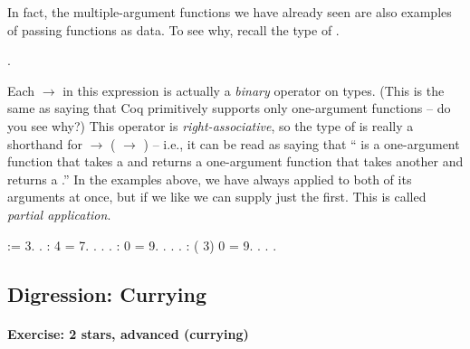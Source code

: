 \documentclass[12pt]{report}
\begin{document}
 In fact, the multiple-argument functions we have already
    seen are also examples of passing functions as data.  To see why,
    recall the type of . \begin{coqdoccode}
\coqdocemptyline
\coqdocnoindent
{} .\coqdoceol
\coqdocemptyline
\end{coqdoccode}
Each \ensuremath{\rightarrow} in this expression is actually a \textit{binary} operator
    on types.  (This is the same as saying that Coq primitively
    supports only one-argument functions -- do you see why?)  This
    operator is \textit{right-associative}, so the type of  is really a
    shorthand for  \ensuremath{\rightarrow} ( \ensuremath{\rightarrow} ) -- i.e., it can be read as
    saying that `` is a one-argument function that takes a 
    and returns a one-argument function that takes another  and
    returns a .''  In the examples above, we have always applied
     to both of its arguments at once, but if we like we can
    supply just the first.  This is called \textit{partial application}. \begin{coqdoccode}
\coqdocemptyline
\coqdocnoindent
{}  :=  3.\coqdoceol
\coqdocnoindent
{} .\coqdoceol
\coqdocemptyline
\coqdocnoindent
{}  :     4 = 7.\coqdoceol
\coqdocnoindent
{}. . .\coqdoceol
\coqdocnoindent
{}  :     0 = 9.\coqdoceol
\coqdocnoindent
{}. . .\coqdoceol
\coqdocnoindent
{}  :   ( 3) 0 = 9.\coqdoceol
\coqdocnoindent
{}. . .\coqdoceol
\coqdocemptyline
\end{coqdoccode}
\subsection{Digression: Currying}



\paragraph{Exercise: 2 stars, advanced (currying)}
\end{document}
